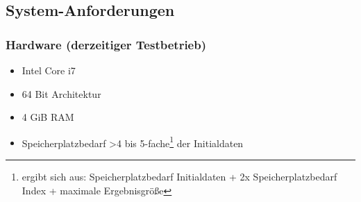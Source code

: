 \documentclass[10pt]{article}
\begin{document}
\subsection{System-Anforderungen}

\subsubsection{Hardware (derzeitiger Testbetrieb)}
\begin{itemize}
	\item Intel Core i7
	\item 64 Bit Architektur
	\item 4 GiB RAM
	\item Speicherplatzbedarf \textgreater 4 bis 5-fache\footnote{ergibt sich aus: Speicherplatzbedarf Initialdaten + 2x Speicherplatzbedarf Index + maximale Ergebnisgröße} der Initialdaten
\end{itemize}
\end{document}
